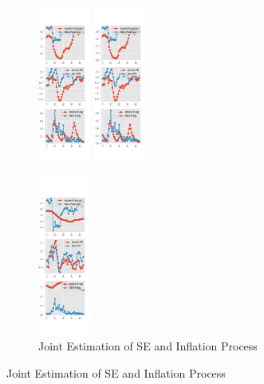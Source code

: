 \documentclass[]{article}
\begin{document}
\begin{figure}[ht]
\begin{subfigure}[b]{\textwidth}
		\includegraphics[width=0.19\textwidth]{figures/spf_se_est_diag3.png}
		\includegraphics[width=0.19\textwidth]{figures/spf_se_est_diag4.png}
	\end{subfigure}
	\vspace{1em}
	\vfill
	\begin{subfigure}[b]{\textwidth}
		\centering
		\caption{Joint Estimation of SE and Inflation Process}
		\label{SE_diag_joint_SPF}
	\includegraphics[width=0.19\textwidth]{figures/spf_se_est_joint_diag0.png}

\end{subfigure}
\end{figure}
\end{document}
